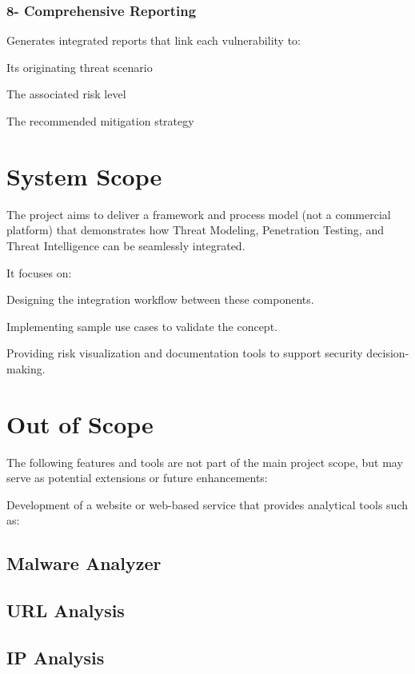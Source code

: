 \documentclass[12pt,a4paper]{report}
\begin{document}
\subsubsection{8- Comprehensive Reporting}

Generates integrated reports that link each vulnerability to:

Its originating threat scenario

The associated risk level

The recommended mitigation strategy

\section{System Scope}

The project aims to deliver a framework and process model (not a commercial platform) that demonstrates how Threat Modeling, Penetration Testing, and Threat Intelligence can be seamlessly integrated.

It focuses on:

Designing the integration workflow between these components.

Implementing sample use cases to validate the concept.

Providing risk visualization and documentation tools to support security decision-making.

\section{Out of Scope}

The following features and tools are not part of the main project scope, but may serve as potential extensions or future enhancements:

Development of a website or web-based service that provides analytical tools such as:

\subsection{Malware Analyzer}

\subsection{URL Analysis}

\subsection{IP Analysis}
\end{document}
